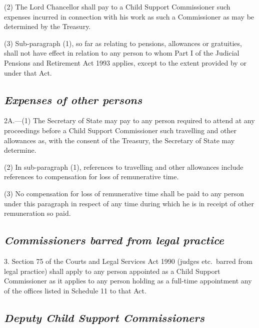 \documentclass[12pt,a4paper]{article}
\begin{document}
(2) The Lord Chancellor shall pay to a Child Support Commissioner such expenses incurred in connection with his work as such a Commissioner as may be determined by the Treasury.

(3) Sub-paragraph (1), so far as relating to pensions, allowances or gratuities, shall not have effect in relation to any person to whom Part I of the Judicial Pensions and Retirement Act 1993 applies, except to the extent provided by or under that Act.


\subsection*{\itshape Expenses of other persons}

2A.---(1) The Secretary of State may pay to any person required to attend at any proceedings before a Child Support Commissioner such travelling and other allowances as, with the consent of the Treasury, the Secretary of State may determine.

(2) In sub-paragraph (1), references to travelling and other allowances include references to compensation for loss of remunerative time.

(3) No compensation for loss of remunerative time shall be paid to any person under this paragraph in respect of any time during which he is in receipt of other remuneration so paid.


\subsection*{\itshape Commissioners barred from legal practice}

3. Section 75 of the Courts and Legal Services Act 1990 (judges etc.\ barred from legal practice) shall apply to any person appointed as a Child Support Commissioner as it applies to any person holding as a full-time appointment any of the offices listed in Schedule 11 to that Act.

\subsection*{\itshape Deputy Child Support Commissioners}
\end{document}
